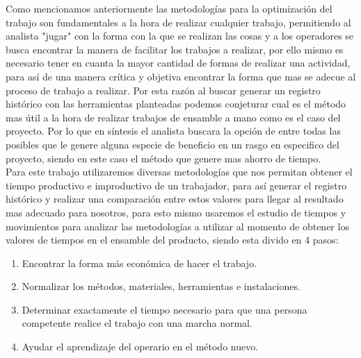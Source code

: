         Como mencionamos anteriormente las metodologías para la optimización del trabajo son fundamentales a la hora de realizar cualquier trabajo, permitiendo al analista "jugar" con la forma con la que se realizan las cosas y a los operadores se busca encontrar la manera de facilitar los trabajos a realizar, por ello mismo es necesario tener en cuanta la mayor cantidad de formas de realizar una actividad, para así de una manera crítica y objetiva encontrar la forma que mas se adecue al proceso de trabajo a realizar. Por esta razón al buscar generar un registro histórico con las herramientas planteadas podemos conjeturar cual es el método mas útil a la hora de realizar trabajos de ensamble a mano como es el caso del proyecto. Por lo que en síntesis el analista buscara la opción de entre todas las posibles que le genere alguna especie de beneficio en un rasgo en especifico del proyecto, siendo en este caso el método que genere mas ahorro de tiempo.
        \\Para este trabajo utilizaremos diversas metodologías que nos permitan obtener el tiempo productivo e improductivo de un trabajador, para así generar el registro histórico y realizar una comparación entre estos valores para llegar al resultado mas adecuado para nosotros, para esto mismo usaremos el estudio de tiempos y movimientos para analizar las metodologías a utilizar al momento de obtener los valores de tiempos en el ensamble del producto, siendo esta divido en 4 pasos: 
        \begin{enumerate}
        \item Encontrar la forma más económica de hacer el trabajo.
        \item Normalizar los métodos, materiales, herramientas e instalaciones.
        \item Determinar exactamente el tiempo necesario para que una persona competente realice el trabajo con una marcha normal.
        \item Ayudar el aprendizaje del operario en el método nuevo.
        \end{enumerate}

